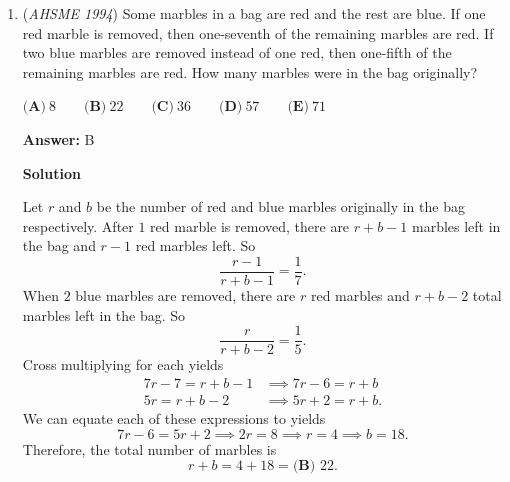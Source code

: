 \begin{enumerate}
\textbf{Solution}

Let $n=10a+b$. So $n^2=(10a+b)^2=100a^2+20ab+b^2$. The term $100a^2$ only contributes digits starting at the hundreds place, so this does not affect whether the tens digit is odd.  The term $20ab$ only contributes digits starting at the tens place, and the tens digit contributed will be the ones digit of $2ab$ which is even.  So we see this term also does not affect whether the tens digit is odd.  This means only $b^2$ can affect whether the tens digit is odd.  We can quickly check $1^2=1, \dots, 9^2=81$ and discover only for $b=4$ or $b=6$ does $b^2$ have an odd tens digit. The total number of positive integers less than or equal to $100$ that have $4$ or $6$ as the units digit is 
 \[10\times 2=\boxed{\textbf{(B) }20.}\]

 --Solution by \href{https://artofproblemsolving.comhttp://www.artofproblemsolving.com/Forum/memberlist.php?mode=viewprofile&u=200685}{TheMaskedMagician}

 


	\item (\textit{AHSME 1994}) Some marbles in a bag are red and the rest are blue. If one red marble is removed, then one-seventh of the remaining marbles are red. If two blue marbles are removed instead of one red, then one-fifth of the remaining marbles are red. How many marbles were in the bag originally?


 $\textbf{(A)}\ 8 \qquad\textbf{(B)}\ 22 \qquad\textbf{(C)}\ 36 \qquad\textbf{(D)}\ 57 \qquad\textbf{(E)}\ 71$

 \textbf{Answer: }B



\textbf{Solution}

Let $r$ and $b$ be the number of red and blue marbles originally in the bag respectively. After $1$ red marble is removed, there are $r+b-1$ marbles left in the bag and $r-1$ red marbles left. So 
 \[\frac{r-1}{r+b-1}=\frac{1}{7}.\] When $2$ blue marbles are removed, there are $r$ red marbles and $r+b-2$ total marbles left in the bag. So 
 \[\frac{r}{r+b-2}=\frac{1}{5}.\] Cross multiplying for each yields 
 \begin{align*}7r-7=r+b-1&\implies 7r-6=r+b\\ 5r=r+b-2&\implies 5r+2=r+b.\end{align*}
 We can equate each of these expressions to yields 
 \[7r-6=5r+2\implies 2r=8\implies r=4\implies b=18.\] Therefore, the total number of marbles is 
 \[r+b=4+18=\boxed{\textbf{(B) }22.}\]


\end{enumerate}
